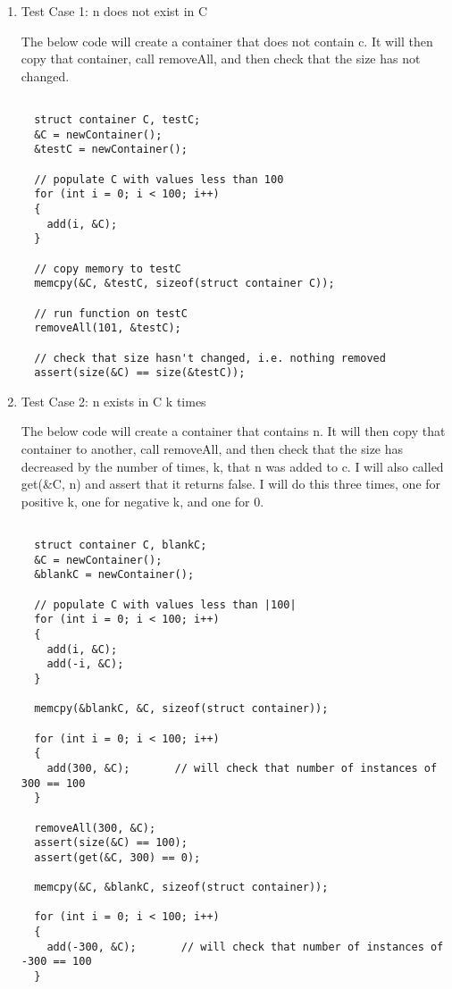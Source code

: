 \documentclass[11pt,letterpaper]{article}
\begin{document}
\begin{enumerate}
  \item Test Case 1: n does not exist in C

    The below code will create a container that does not contain c. 
    It will then copy that container, call removeAll, and then
    check that the size has not changed.
  \begin{lstlisting}
  
  struct container C, testC;
  &C = newContainer();
  &testC = newContainer();
  
  // populate C with values less than 100
  for (int i = 0; i < 100; i++) 
  {
    add(i, &C);
  }
  
  // copy memory to testC
  memcpy(&C, &testC, sizeof(struct container C));
  
  // run function on testC
  removeAll(101, &testC);
  
  // check that size hasn't changed, i.e. nothing removed
  assert(size(&C) == size(&testC));

  \end{lstlisting}

  \item Test Case 2: n exists in C k times

    The below code will create a container that contains n. It will then
    copy that container to another, call removeAll, and then check
    that the size has decreased by the number of times, k, that n was
    added to c. I will also called get(\&C, n) and assert that it returns
    false. I will do this three times, one for positive k, one for 
    negative k, and one for 0. 

  \begin{lstlisting}
  
  struct container C, blankC;
  &C = newContainer();
  &blankC = newContainer();
  
  // populate C with values less than |100|
  for (int i = 0; i < 100; i++) 
  {
    add(i, &C);
    add(-i, &C);
  }

  memcpy(&blankC, &C, sizeof(struct container));

  for (int i = 0; i < 100; i++) 
  {
    add(300, &C);       // will check that number of instances of 300 == 100
  }
  
  removeAll(300, &C);
  assert(size(&C) == 100);
  assert(get(&C, 300) == 0);

  memcpy(&C, &blankC, sizeof(struct container));

  for (int i = 0; i < 100; i++) 
  {
    add(-300, &C);       // will check that number of instances of -300 == 100
  }


\end{lstlisting}
\end{enumerate}
\end{document}
